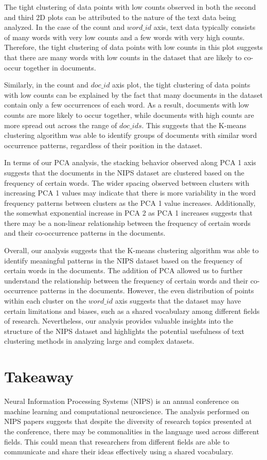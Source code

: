 \documentclass{article}
\begin{document}
The tight clustering of data points with low counts observed in both the second and third 2D plots can be attributed to the nature of the text data being analyzed. In the case of the count and $word\_id$ axis, text data typically consists of many words with very low counts and a few words with very high counts. Therefore, the tight clustering of data points with low counts in this plot suggests that there are many words with low counts in the dataset that are likely to co-occur together in documents.

Similarly, in the count and $doc\_id$ axis plot, the tight clustering of data points with low counts can be explained by the fact that many documents in the dataset contain only a few occurrences of each word. As a result, documents with low counts are more likely to occur together, while documents with high counts are more spread out across the range of $doc\_ids$. This suggests that the K-means clustering algorithm was able to identify groups of documents with similar word occurrence patterns, regardless of their position in the dataset.


In terms of our PCA analysis, the stacking behavior observed along PCA 1 axis suggests that the documents in the NIPS dataset are clustered based on the frequency of certain words. The wider spacing observed between clusters with increasing PCA 1 values may indicate that there is more variability in the word frequency patterns between clusters as the PCA 1 value increases. Additionally, the somewhat exponential increase in PCA 2 as PCA 1 increases suggests that there may be a non-linear relationship between the frequency of certain words and their co-occurrence patterns in the documents.

Overall, our analysis suggests that the K-means clustering algorithm was able to identify meaningful patterns in the NIPS dataset based on the frequency of certain words in the documents. The addition of PCA allowed us to further understand the relationship between the frequency of certain words and their co-occurrence patterns in the documents. However, the even distribution of points within each cluster on the $word\_id$ axis suggests that the dataset may have certain limitations and biases, such as a shared vocabulary among different fields of research. Nevertheless, our analysis provides valuable insights into the structure of the NIPS dataset and highlights the potential usefulness of text clustering methods in analyzing large and complex datasets.

\section{Takeaway}
Neural Information Processing Systems (NIPS) is an annual conference on machine learning and computational neuroscience. The analysis performed on NIPS papers suggests that despite the diversity of research topics presented at the conference, there may be commonalities in the language used across different fields. This could mean that researchers from different fields are able to communicate and share their ideas effectively using a shared vocabulary.
\end{document}
